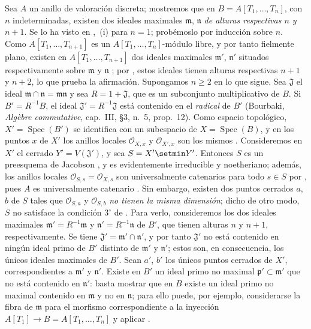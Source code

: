 \begin{env}[10.7.3]
\label{IV.10.7.3}
Sea $A$ un anillo de valoración discreta; mostremos que en $B=A[T_1,\ldots,T_n]$, con $n$ indeterminadas, existen dos ideales maximales $\mathfrak m$, $\mathfrak n$ \emph{de alturas respectivas $n$ y} $n+1$.
Se lo ha visto en ,~(i) para $n=1$; probémoslo por inducción sobre $n$.
Como $A[T_1,\ldots,T_{n+1}]$ es un $A[T_1,\ldots,T_n]$-módulo libre, y por tanto fielmente plano, existen en $A[T_1,\ldots,T_{n+1}]$ dos ideales maximales $\mathfrak m'$, $\mathfrak n'$ situados respectivamente sobre $\mathfrak m$ y $\mathfrak n$ ; por , estos ideales tienen alturas respectivas $n+1$ y $n+2$, lo que prueba la afirmación.
Supongamos $n\geq2$ en lo que sigue.
Sea $\mathfrak J$ el ideal $\mathfrak m\cap\mathfrak n=\mathfrak m\mathfrak n$ y sea $R=1+\mathfrak J$, que es un subconjunto multiplicativo de $B$.
Si $B'=R^{-1}B$, el ideal $\mathfrak J'=R^{-1}\mathfrak J$ está contenido en el \emph{radical} de $B'$ (Bourbaki, \emph{Alg\`ebre commutative}, cap.~III, \S3, n.~5, prop.~12).
Como espacio topológico, $X'=\operatorname{Spec}(B')$ se identifica con un subespacio de $X=\operatorname{Spec}(B)$, y en los puntos $x$ de $X'$ los anillos locales $\mathcal O_{X,x}$ y $\mathcal O_{X',x}$ son los mismos .
Consideremos en $X'$ el cerrado $Y'=V(\mathfrak J')$, y sea $S=X'\setmin Y'$.
Entonces $S$ es un preesquema de Jacobson , y es evidentemente irreducible y noetheriano; además, los anillos locales $\mathcal O_{S,s}=\mathcal O_{X,s}$ son universalmente catenarios para todo $s\in S$ por , pues $A$ es universalmente catenario .
Sin embargo, existen dos puntos cerrados $a$, $b$ de $S$ tales que $\mathcal O_{S,a}$ y $\mathcal O_{S,b}$ \emph{no tienen la misma dimensión}; dicho de otro modo, $S$ no satisface la condición $3^\circ$ de .
Para verlo, consideremos los dos ideales maximales $\mathfrak m'=R^{-1}\mathfrak m$ y $\mathfrak n'=R^{-1}\mathfrak n$ de $B'$, que tienen alturas $n$ y $n+1$, respectivamente.
Se tiene $\mathfrak J'=\mathfrak m'\cap\mathfrak n'$, y por tanto $\mathfrak J'$ no está contenido en ningún ideal primo de $B'$ distinto de $\mathfrak m'$ y $\mathfrak n'$; estos son, en consecuencia, los únicos ideales maximales de $B'$.
Sean $a'$, $b'$ los únicos puntos cerrados de $X'$, correspondientes a $\mathfrak m'$ y $\mathfrak n'$.
Existe en $B'$ un ideal primo no maximal $\mathfrak p'\subset\mathfrak m'$ que no está contenido en $\mathfrak n'$: basta mostrar que en $B$ existe un ideal primo no maximal contenido en $\mathfrak m$ y no en $\mathfrak n$; para ello puede, por ejemplo, considerarse la fibra de $\mathfrak m$ para el morfismo correspondiente a la inyección $A[T_1]\to B=A[T_1,\ldots,T_n]$ y aplicar .

\end{env}
